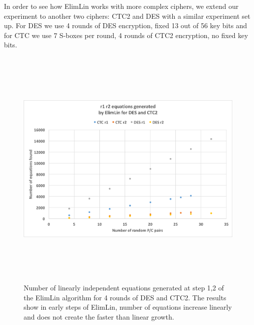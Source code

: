 In order to see how ElimLin works with more complex ciphers, we extend our experiment to another two ciphers: CTC2 and DES with a similar experiment set up.
For DES we use 4 rounds of DES encryption, fixed 13 out of 56 key bits and for CTC we use 7 S-boxes per round, 4 rounds of CTC2 encryption, no fixed key bits.
\begin{figure}[!h]
	\vspace{-0.2cm}
	\centering
	\includegraphics*[width=140mm,height=12cm]{./pics/Test641.png}
	\caption[Number of linearly independent equations generated at step 1,2
	of the ElimLin algorithm for DES and CTC2]{Number of linearly independent equations generated at step 1,2
		of the ElimLin algorithm
		for 4 rounds of DES and CTC2. The results show in early steps of ElimLin, number of equations increase linearly and does not create the faster than linear growth.}
	\label{fig:ElimLinEquationCTCDES1}
	\vspace{-0.1cm}
\end{figure}
